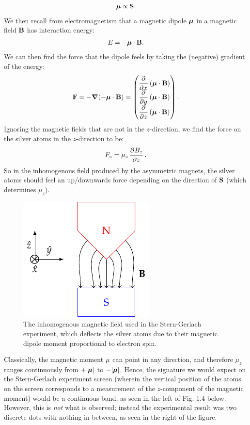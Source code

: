 \begin{equation}
    \mbox{\boldmath$ \mu $} \propto \mathbf{S}.
\end{equation}
We then recall from electromagnetism that a magnetic dipole $\mbox{\boldmath$ \mu $}$ in a magnetic field $\mathbf{B}$ has interaction energy:
\begin{equation}
    E = -\mbox{\boldmath$ \mu $} \cdot \mathbf{B}.
\end{equation}
We can then find the force that the dipole feels by taking the (negative) gradient of the energy:
\begin{equation}
    \v{F} = -\gv{\nabla}(-\gv{\mu} \cdot \v{B}) = \mat{\dpd{}{x}(\gv{\mu} \cdot \v{B}) \\ \dpd{}{y}(\gv{\mu} \cdot \v{B}) \\ \dpd{}{z}(\gv{\mu} \cdot \v{B})}.
\end{equation}
Ignoring the magnetic fields that are not in the $z$-direction, we find the force on the silver atoms in the $z$-direction to be:
\begin{equation}
    F_z = \mu_z \dpd{B_z}{z}.
\end{equation}
So in the inhomogenous field produced by the asymmetric magnets, the silver atoms should feel an up/downwards force depending on the direction of $\mathbf{S}$ (which determines $\mu_z$). 

\begin{figure}[htbp]
    \centering
    \includegraphics[]{Images/fig-SGexpmagnet.pdf}
    \caption{The inhomogenous magnetic field used in the Stern-Gerlach experiment, which deflects the silver atoms due to their magnetic dipole moment proportional to electron spin.}
    \label{fig-SGexpmagnet}
\end{figure}

Classically, the magnetic moment $\mathbf{\mu}$ can point in any direction, and therefore $\mu_z$ ranges continuously from $+\lvert \mbox{\boldmath$ \mu $} \rvert$ to $-\lvert \mbox{\boldmath$ \mu $} \rvert$. Hence, the signature we would expect on the Stern-Gerlach experiment screen (wherein the vertical position of the atoms on the screen corresponds to a measurement of the $z$-component of the magnetic moment) would be a continuous band, as seen in the left of Fig. 1.4 below. However, this is \emph{not} what is observed; instead the experimental result was two discrete dots with nothing in between, as seen in the right of the figure. 

